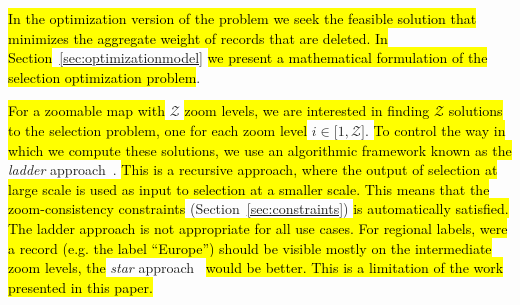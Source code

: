 \hl{In the optimization version of the problem we seek the feasible solution that minimizes the aggregate weight of records that are deleted. In Section}~\ref{sec:optimizationmodel}\hl{ we present a mathematical formulation of the selection optimization problem}.

\hl{For a zoomable map with }$\mathcal{Z}$\hl{ zoom levels, we are interested in finding $\mathcal{Z}$ solutions to the selection problem, one for each zoom level }$i \in \lbrack 1, \mathcal{Z} \rbrack$. \hl{To control the way in which we compute these solutions, we use an algorithmic framework known as the }\emph{ladder} approach~\cite{foerster2010challenges}. \hl{This is a recursive approach, where the output of selection at large scale is used as input to selection at a smaller scale. This means that the zoom-consistency constraints }(Section~\ref{sec:constraints})\hl{ is automatically satisfied. The ladder approach is not appropriate for all use cases. For regional labels, were a record (e.g. the label ``Europe'') should be visible mostly on the intermediate zoom levels, the }\emph{star} approach~\cite{foerster2010challenges}\hl{ would be better. This is a limitation of the work presented in this paper.}



